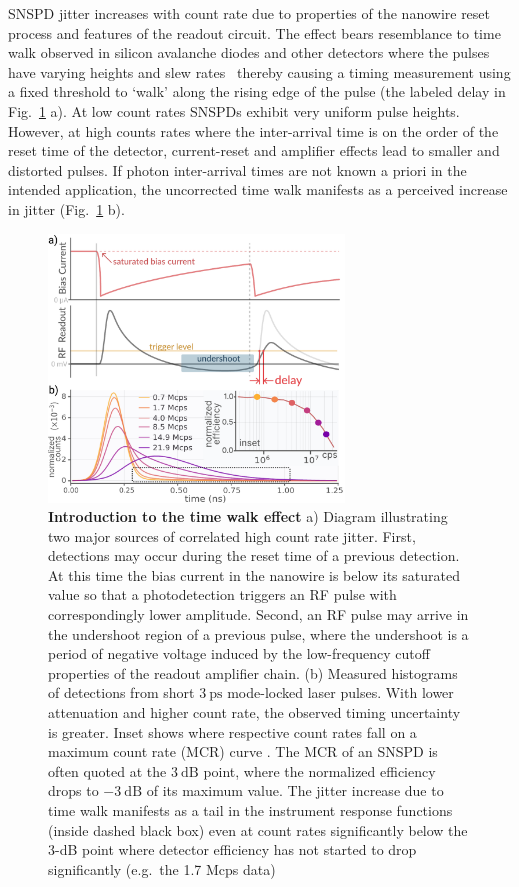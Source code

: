 \documentclass[11pt]{caltech_thesis} %
\begin{document}
SNSPD jitter increases with count rate due to properties of the nanowire reset process and features of the readout circuit. The effect bears resemblance to time walk observed in silicon avalanche diodes and other detectors where the pulses have varying heights and slew rates~\autocite{SPAD_walk_Kirchnir_1997} thereby causing a timing measurement using a fixed threshold to `walk' along the rising edge of the pulse (the labeled delay in Fig.~\ref{fig:jitterate_intro} a).
At low count rates SNSPDs exhibit very uniform pulse heights. However, at high counts rates where the inter-arrival time is on the order of the reset time of the detector, current-reset and amplifier effects lead to smaller and distorted pulses. If photon inter-arrival times are not known a priori in the intended application, the uncorrected time walk manifests as a perceived increase in jitter (Fig.~\ref{fig:jitterate_intro} b).

\hypertarget{fig:jitterate_intro}{%
\begin{figure}
\centering
\includegraphics[width=0.7\textwidth,height=\textheight]{chapter_02/figs_02/intro_jitterate_light.pdf}
\caption[{Introduction to the time walk effect}]{\textbf{Introduction to the time walk effect} a) Diagram illustrating two major sources of correlated high count rate jitter. First, detections may occur during the reset time of a previous detection. At this time the bias current in the nanowire is below its saturated value so that a photodetection triggers an RF pulse with correspondingly lower amplitude. Second, an RF pulse may arrive in the undershoot region of a previous pulse, where the undershoot is a period of negative voltage induced by the low-frequency cutoff properties of the readout amplifier chain. (b) Measured histograms of detections from short $3~\mathrm{ps}$ mode-locked laser pulses. With lower attenuation and higher count rate, the observed timing uncertainty is greater. Inset shows where respective count rates fall on a maximum count rate (MCR) curve \autocite{Zhang_MCR_2019}. The MCR of an SNSPD is often quoted at the $3~\mathrm{dB}$ point, where the normalized efficiency drops to $-3~\mathrm{dB}$ of its maximum value. The jitter increase due to time walk manifests as a tail in the instrument response functions (inside dashed black box) even at count rates significantly below the 3-dB point where detector efficiency has not started to drop significantly (e.g.~the 1.7 Mcps data)}
\label{fig:jitterate_intro}
\end{figure}
}
\end{document}
